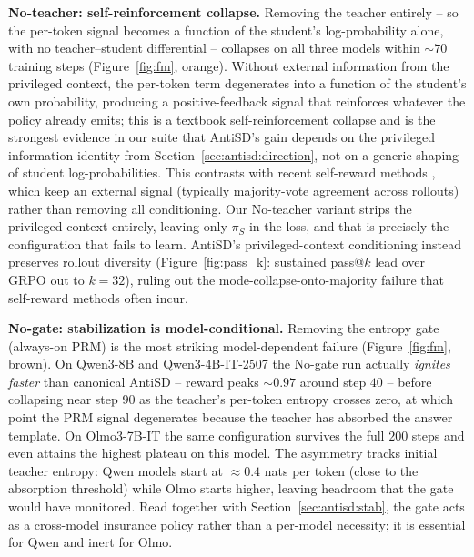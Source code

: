 \documentclass{llmxive}
\begin{document}
\textbf{No-teacher: self-reinforcement collapse.} Removing the teacher entirely -- so the per-token signal becomes a function of the student's log-probability alone, with no teacher--student differential -- collapses on all three models within $\sim 70$ training steps (Figure~\ref{fig:fm}, orange). Without external information from the privileged context, the per-token term degenerates into a function of the student's own probability, producing a positive-feedback signal that reinforces whatever the policy already emits; this is a textbook self-reinforcement collapse and is the strongest evidence in our suite that AntiSD's gain depends on the privileged information identity from Section~\ref{sec:antisd:direction}, not on a generic shaping of student log-probabilities. This contrasts with recent self-reward methods \citep{zhao2025learning,he2026far}, which keep an external signal (typically majority-vote agreement across rollouts) rather than removing all conditioning. Our No-teacher variant strips the privileged context entirely, leaving only $\pi_S$ in the loss, and that is precisely the configuration that fails to learn. AntiSD's privileged-context conditioning instead preserves rollout diversity (Figure~\ref{fig:pass_k}: sustained pass@$k$ lead over GRPO out to $k=32$), ruling out the mode-collapse-onto-majority failure that self-reward methods often incur.

\textbf{No-gate: stabilization is model-conditional.} Removing the entropy gate (always-on PRM) is the most striking model-dependent failure (Figure~\ref{fig:fm}, brown). On Qwen3-8B and Qwen3-4B-IT-2507 the No-gate run actually \emph{ignites faster} than canonical AntiSD -- reward peaks $\sim 0.97$ around step $40$ -- before collapsing near step $90$ as the teacher's per-token entropy crosses zero, at which point the PRM signal degenerates because the teacher has absorbed the answer template. On Olmo3-7B-IT the same configuration survives the full $200$ steps and even attains the highest plateau on this model. The asymmetry tracks initial teacher entropy: Qwen models start at $\approx 0.4$ nats per token (close to the absorption threshold) while Olmo starts higher, leaving headroom that the gate would have monitored. Read together with Section~\ref{sec:antisd:stab}, the gate acts as a cross-model insurance policy rather than a per-model necessity; it is essential for Qwen and inert for Olmo.
\end{document}
